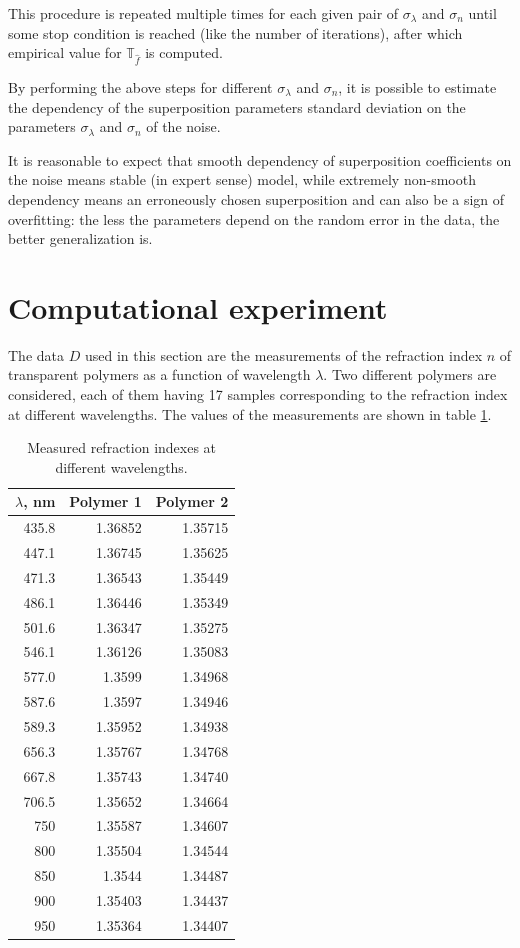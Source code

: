 \documentclass[11pt,a4paper]{article}
\theoremstyle{definition}
\begin{document}
This procedure is repeated multiple times for each given pair of $\sigma_{\lambda}$ and $\sigma_n$
until some stop condition is reached (like the number of iterations), after which
empirical value for $\mathbb{T}_{\hat{f}}$ is computed.

By performing the above steps for different $\sigma_{\lambda}$ and $\sigma_n$,
it is possible to estimate the dependency of the superposition parameters
standard deviation on the parameters $\sigma_{\lambda}$ and $\sigma_n$ of the noise.

It is reasonable to expect that smooth dependency of superposition coefficients
on the noise means stable (in expert sense) model, while extremely
non-smooth dependency means an erroneously chosen superposition and can also be
a sign of overfitting: the less the parameters depend on the random error
in the data, the better generalization is.

\section{Computational experiment}

The data $D$ used in this section are the measurements of the refraction index $n$
of transparent polymers as a function of wavelength $\lambda$. Two different polymers
are considered, each of them having 17 samples corresponding to the
refraction index at different wavelengths. The values of the measurements
are shown in table \ref{tabl:source_data}.

\begin{table}[h]
  \footnotesize
  \caption{Measured refraction indexes at different wavelengths.}
  \centering
  \begin{tabular}{r | r | r}
	$\lambda$, nm	& Polymer 1 & Polymer 2 \\ \hline
	435.8 & 1.36852 & 1.35715 \\
	447.1 & 1.36745 & 1.35625 \\
	471.3 & 1.36543 & 1.35449 \\
	486.1 & 1.36446 & 1.35349 \\
	501.6 & 1.36347 & 1.35275 \\
	546.1 & 1.36126 & 1.35083 \\
	577.0 & 1.3599 & 1.34968 \\
	587.6 & 1.3597 & 1.34946 \\
	589.3 & 1.35952 & 1.34938 \\
	656.3 & 1.35767 & 1.34768 \\
	667.8 & 1.35743 & 1.34740 \\
	706.5 & 1.35652 & 1.34664 \\
	750 & 1.35587 & 1.34607 \\
	800 & 1.35504 & 1.34544 \\
	850 & 1.3544 & 1.34487 \\
	900 & 1.35403 & 1.34437 \\
	950 & 1.35364 & 1.34407 \\
  \end{tabular}
  \label{tabl:source_data}
\end{table}
\end{document}

